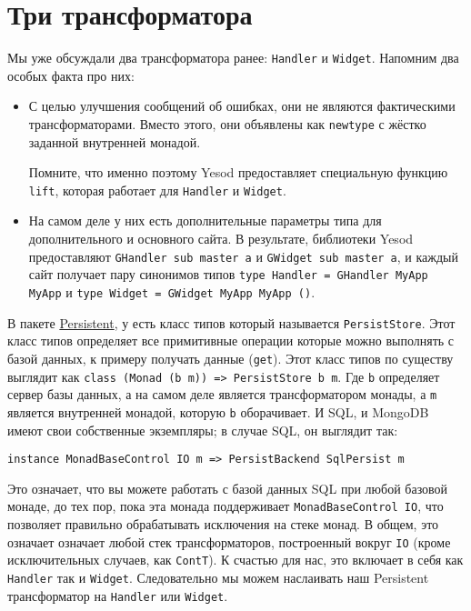 \section{Три трансформатора}

Мы уже обсуждали два трансформатора ранее: \lstinline'Handler' и \lstinline'Widget'.
Напомним два особых факта про них:
\begin{itemize}
\item  С целью улучшения сообщений об ошибках, они не являются фактическими
трансформаторами. Вместо этого, они объявлены как \lstinline'newtype' с жёстко заданной
внутренней монадой. 
\begin{remark}Помните, что именно поэтому Yesod предоставляет специальную функцию
\lstinline'lift', которая работает для \lstinline'Handler' и \lstinline'Widget'.
\end{remark}
\item  На самом деле у них есть дополнительные параметры типа для дополнительного и
основного сайта. В результате, библиотеки Yesod предоставляют 
\lstinline'GHandler sub master a' и \lstinline'GWidget sub master a', и каждый сайт
получает пару синонимов типов \lstinline'type Handler = GHandler MyApp MyApp' и
\lstinline'type Widget = GWidget MyApp MyApp ()'.
\end{itemize}

В пакете \hyperref[chap:persistent]{Persistent}, у есть класс типов который называется
\lstinline'PersistStore'. Этот класс типов
определяет все примитивные операции которые можно выполнять с базой данных, к примеру
получать данные (\lstinline'get'). Этот класс типов по существу выглядит как 
\lstinline'class (Monad (b m)) => PersistStore b m'. Где \lstinline'b' определяет сервер
базы данных, а на самом деле является трансформатором монады, а \lstinline'm' является
внутренней монадой, которую \lstinline'b' оборачивает. И SQL, и MongoDB имеют свои
собственные экземпляры; в случае SQL, он выглядит
так:

\begin{lstlisting}
instance MonadBaseControl IO m => PersistBackend SqlPersist m
\end{lstlisting}

Это означает, что вы можете работать с базой данных SQL при любой базовой монаде, до тех 
пор, пока эта монада поддерживает \lstinline'MonadBaseControl IO', что позволяет правильно
обрабатывать исключения на стеке монад. В общем, это означает означает любой стек
трансформаторов, построенный вокруг \lstinline'IO' (кроме исключительных случаев, как
\lstinline'ContT'). К счастью для нас, это включает в себя как \lstinline'Handler' так и
\lstinline'Widget'. Следовательно мы можем наслаивать наш Persistent трансформатор на
\lstinline'Handler' или \lstinline'Widget'.

